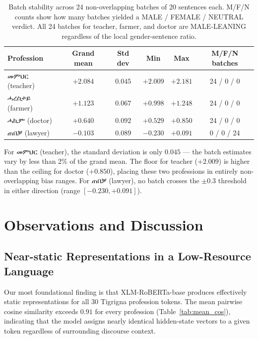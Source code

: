 \documentclass[11pt,a4paper]{article}
\begin{document}
\begin{table}[h]
\centering
\small
\begin{tabular}{lccccc}
\toprule
\textbf{Profession} & \textbf{Grand mean} & \textbf{Std dev} & \textbf{Min} & \textbf{Max} & \textbf{M/F/N batches} \\
\midrule
{\ethiopicfont መምህር} (teacher)  & $+2.084$ & $0.045$ & $+2.009$ & $+2.181$ & 24 / 0 / 0 \\
{\ethiopicfont ሓረስታይ} (farmer) & $+1.123$ & $0.067$ & $+0.998$ & $+1.248$ & 24 / 0 / 0 \\
{\ethiopicfont ሓኪም}  (doctor)  & $+0.640$ & $0.092$ & $+0.529$ & $+0.850$ & 24 / 0 / 0 \\
{\ethiopicfont ጠበቓ}  (lawyer)  & $-0.103$ & $0.089$ & $-0.230$ & $+0.091$ &  0 / 0 / 24 \\
\bottomrule
\end{tabular}
\caption{Batch stability across 24 non-overlapping batches of 20 sentences each.
M/F/N counts show how many batches yielded a MALE / FEMALE / NEUTRAL verdict.
All 24 batches for teacher, farmer, and doctor are MALE-LEANING regardless of
the local gender-sentence ratio.}
\label{tab:batch}
\end{table}

For {\ethiopicfont መምህር} (teacher), the standard deviation is only $0.045$ — the
batch estimates vary by less than 2\% of the grand mean. The floor for teacher
($+2.009$) is higher than the ceiling for doctor ($+0.850$), placing these two
professions in entirely non-overlapping bias ranges. For
{\ethiopicfont ጠበቓ} (lawyer), no batch crosses the $\pm 0.3$ threshold in either
direction (range $[-0.230, +0.091]$).


\section{Observations and Discussion}

\subsection{Near-static Representations in a Low-Resource Language}

Our most foundational finding is that XLM-RoBERTa-base produces effectively
static representations for all 30 Tigrigna profession tokens. The mean pairwise
cosine similarity exceeds $0.91$ for every profession (Table~\ref{tab:mean_cos}),
indicating that the model assigns nearly identical hidden-state vectors to a
given token regardless of surrounding discourse context.
\end{document}
